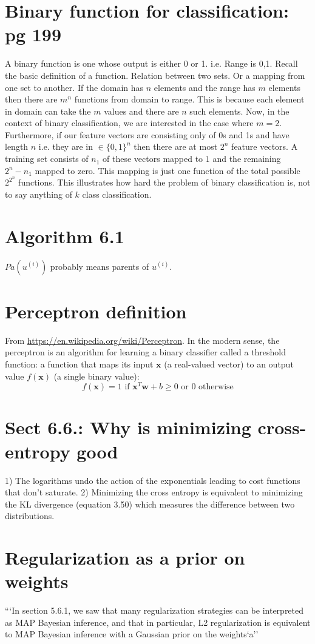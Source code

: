 \documentclass{article}
\newcommand{\beq}{\begin{equation}}
\newcommand{\eeq}{\end{equation}}
\begin{document}
\section{Binary function for classification: pg 199 }
A binary function is one whose output is either 0 or 1. i.e. Range is {0,1}. Recall the basic definition of a function. Relation between two sets. Or a mapping from one set to another. If the domain has $n$ elements and the range has $m$ elements then there are $m^n$ functions from domain to range. This is because each element in domain can take the $m$ values  and there are $n$ such elements. Now, in the context of binary classification, we are interested in the case where $m=2$. Furthermore, if our feature vectors are consisting only of 0s and 1s and have length $n$ i.e. they are in $\in\{0,1\}^n$ then there are at most $2^n$ feature vectors. A training set consists of $n_1$ of these vectors mapped to $1$ and the remaining $2^n-n_1$ mapped to zero. This mapping is just one function of the total possible $2^{2^n}$ functions. This illustrates how hard the problem of binary classification is, not to say anything of $k$ class classification.
%
%
%
\section{Algorithm 6.1}
$Pa(u^{(i)})$ probably means parents of $u^{(i)}$.
\section{Perceptron definition}
From \url{https://en.wikipedia.org/wiki/Perceptron}. In the modern sense, the perceptron is an algorithm for learning a binary classifier called a threshold function: a function that maps its input {$\mathbf {x}$} (a real-valued vector) to an output value $f(\mathbf{x})$ (a single binary value):
\beq
f(\mathbf{x}) = 1 \text{ if } \mathbf{x}^T\mathbf{w} + b \ge 0   \text{ or 0 otherwise} 
\eeq
\section{Sect 6.6.: Why is minimizing cross-entropy good}
1) The logarithms undo the action of the exponentials leading to cost functions that don't saturate.
2) Minimizing the cross entropy is equivalent to minimizing the KL divergence (equation 3.50) which measures the difference between two distributions.
%
%
%
\section{Regularization as a prior on weights }
```In section 5.6.1, we saw that many regularization strategies can be interpreted as MAP Bayesian inference, and that in particular, L2 regularization is equivalent to MAP Bayesian inference with a Gaussian prior on the weights`a''
%
%
%
\end{document}
